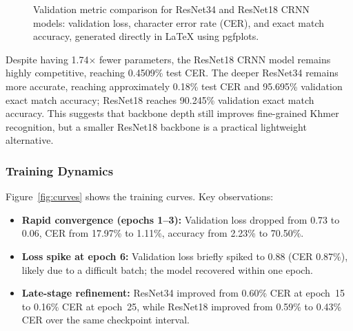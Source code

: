 \documentclass[conference]{IEEEtran}
\begin{document}
\begin{figure}[htbp]
{%
}
\caption{Validation metric comparison for ResNet34 and ResNet18 CRNN models: validation loss, character error rate (CER), and exact match accuracy, generated directly in LaTeX using pgfplots.}
\label{fig:resnet-comparison}
\end{figure}

Despite having 1.74$\times$ fewer parameters, the ResNet18 CRNN model remains highly
competitive, reaching 0.4509\% test CER. The deeper ResNet34 remains more
accurate, reaching approximately 0.18\% test CER and 95.695\% validation exact
match accuracy; ResNet18 reaches 90.245\% validation exact match accuracy. This suggests that backbone depth still improves fine-grained
Khmer recognition, but a smaller ResNet18 backbone is a practical lightweight
alternative.

\subsubsection{Training Dynamics}

Figure~\ref{fig:curves} shows the training curves. Key observations:
\begin{itemize}
  \item \textbf{Rapid convergence (epochs 1--3):} Validation loss dropped from
        0.73 to 0.06, CER from 17.97\% to 1.11\%, accuracy from 2.23\% to
        70.50\%.
  \item \textbf{Loss spike at epoch 6:} Validation loss briefly spiked to 0.88
        (CER 0.87\%), likely due to a difficult batch; the model recovered
        within one epoch.
  \item \textbf{Late-stage refinement:} ResNet34 improved from 0.60\% CER at
        epoch~15 to 0.16\% CER at epoch~25, while ResNet18 improved from
        0.59\% to 0.43\% CER over the same checkpoint interval.
\end{itemize}
\end{document}
